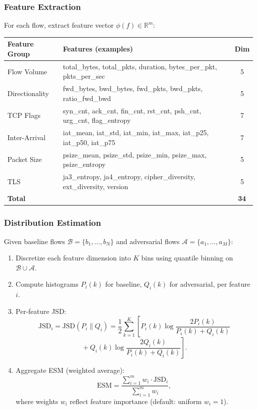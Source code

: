 \documentclass[review]{elsarticle}
\begin{document}
\subsubsection{Feature Extraction}
For each flow, extract feature vector $\phi(f) \in \mathbb{R}^m$:

\begin{table}[htbp]
\small
\centering
\renewcommand{\arraystretch}{1.2}
\begin{tabular}{|p{2.3cm}|p{7.8cm}|c|}
\hline
\textbf{Feature Group} & \textbf{Features (examples)} & \textbf{Dim} \\
\hline
Flow Volume & total\_bytes, total\_pkts, duration, bytes\_per\_pkt, pkts\_per\_sec & 5 \\
Directionality & fwd\_bytes, bwd\_bytes, fwd\_pkts, bwd\_pkts, ratio\_fwd\_bwd & 5 \\
TCP Flags & syn\_cnt, ack\_cnt, fin\_cnt, rst\_cnt, psh\_cnt, urg\_cnt, flag\_entropy & 7 \\
Inter-Arrival & iat\_mean, iat\_std, iat\_min, iat\_max, iat\_p25, iat\_p50, iat\_p75 & 7 \\
Packet Size & psize\_mean, psize\_std, psize\_min, psize\_max, psize\_entropy & 5 \\
TLS & ja3\_entropy, ja4\_entropy, cipher\_diversity, ext\_diversity, version & 5 \\
\hline
\textbf{Total} & & \textbf{34} \\
\hline
\end{tabular}
\end{table}

\subsubsection{Distribution Estimation}
Given baseline flows $\mathcal{B} = \{b_1, \dots, b_N\}$ and adversarial flows $\mathcal{A} = \{a_1, \dots, a_M\}$:
\begin{enumerate}
\item Discretize each feature dimension into $K$ bins using quantile binning on $\mathcal{B} \cup \mathcal{A}$.
\item Compute histograms $P_i(k)$ for baseline, $Q_i(k)$ for adversarial, per feature $i$.
\item Per-feature JSD:
\[
\text{JSD}_i = \text{JSD}(P_i \parallel Q_i) = \frac{1}{2} \sum_{k=1}^K \left[ P_i(k) \log \frac{2P_i(k)}{P_i(k)+Q_i(k)} \right.
\]
\[
\left. {} + Q_i(k) \log \frac{2Q_i(k)}{P_i(k)+Q_i(k)} \right].
\]
\item Aggregate ESM (weighted average):
\[
\text{ESM} = \frac{\sum_{i=1}^m w_i \cdot \text{JSD}_i}{\sum_{i=1}^m w_i},
\]
where weights $w_i$ reflect feature importance (default: uniform $w_i = 1$).
\end{enumerate}
\end{document}

